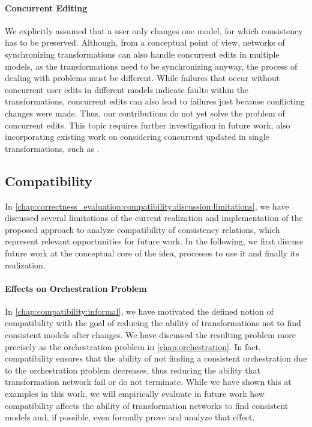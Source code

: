 \paragraph{Concurrent Editing}
\label{chap:futurework:corretness:concurrent}
We explicitly assumed that a user only changes one model, for which consistency has to be preserved.
Although, from a conceptual point of view, networks of synchronizing transformations can also handle concurrent edits in multiple models, as the transformations need to be synchronizing anyway, the process of dealing with problems must be different.
While failures that occur without concurrent user edits in different models indicate faults within the transformations, concurrent edits can also lead to failures just because conflicting changes were made.
Thus, our contributions do not yet solve the problem of concurrent edits.
This topic requires further investigation in future work, also incorporating existing work on considering concurrent updated in single transformations, such as \cite{xiong2013SynchronizingConcurrentUpdates-SoSym,xiong2009parallelUpdates-ICMT}.


\subsection{Compatibility}

In \autoref{chap:correctness_evaluation:compatibility:discussion:limitations}, we have discussed several limitations of the current realization and implementation of the proposed approach to analyze compatibility of consistency relations, which represent relevant opportunities for future work.
In the following, we first discuss future work at the conceptual core of the idea, processes to use it and finally its realization.

\paragraph{Effects on Orchestration Problem}
\label{chap:futurework:correctness:compatibility:orchestration}
In \autoref{chap:compatibility:informal}, we have motivated the defined notion of compatibility with the goal of reducing the ability of transformations not to find consistent models after changes.
We have discussed the resulting problem more precisely as the orchestration problem in \autoref{chap:orchestration}.
In fact, compatibility ensures that the ability of not finding a consistent orchestration due to the orchestration problem decreases, thus reducing the ability that transformation network fail or do not terminate.
While we have shown this at examples in this work, we will empirically evaluate in future work how compatibility affects the ability of transformation networks to find consistent models and, if possible, even formally prove and analyze that effect. 

